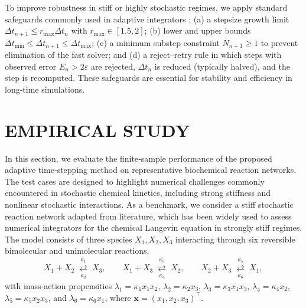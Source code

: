 \documentclass{article}
\begin{document}
To improve robustness in stiff or highly stochastic regimes, we apply standard
safeguards commonly used in adaptive integrators
\cite{ilie2015adaptive}:
(a) a stepsize growth limit
$\Delta t_{n+1}\le r_{\max}\Delta t_n$ with $r_{\max}\in[1.5,2]$;
(b) lower and upper bounds
$\Delta t_{\min}\le\Delta t_{n+1}\le\Delta t_{\max}$;
(c) a minimum substep constraint $N_{n+1}\ge1$ to prevent elimination of the
fast solver; and
(d) a reject--retry rule in which steps with observed error
$E_n>2\varepsilon$ are rejected, $\Delta t_n$ is reduced (typically halved), and
the step is recomputed.
These safeguards are essential for stability and efficiency in long‑time simulations.



\section{EMPIRICAL STUDY}
\label{sec:Empirical Study}


In this section, we evaluate the finite‑sample performance of the proposed adaptive time‑stepping method on representative biochemical reaction networks. The test cases are designed to highlight numerical challenges commonly encountered in stochastic chemical kinetics, including strong stiffness and nonlinear stochastic interactions. As a benchmark, we consider a stiff stochastic reaction network adapted from literature\cite{ilie2015adaptive}, which has been widely used to assess numerical integrators for the chemical Langevin equation in strongly stiff regimes.
The model consists of three species $X_1,X_2,X_3$ interacting through six reversible bimolecular and unimolecular reactions,
\[
\begin{aligned}
X_1+X_2 \;\overset{\kappa_1}{\underset{\kappa_2}{\rightleftarrows}}\; X_3,\qquad
X_1+X_3 \;\overset{\kappa_3}{\underset{\kappa_4}{\rightleftarrows}}\; X_2,\qquad
X_2+X_3 \;\overset{\kappa_5}{\underset{\kappa_6}{\rightleftarrows}}\; X_1,
\end{aligned}
\]
with mass-action propensities
$\lambda_1=\kappa_1 x_1x_2$, $\lambda_2=\kappa_2 x_3$,
$\lambda_3=\kappa_3 x_1x_3$, $\lambda_4=\kappa_4 x_2$,
$\lambda_5=\kappa_5 x_2x_3$, and $\lambda_6=\kappa_6 x_1$,
where $\pmb{x}=(x_1,x_2,x_3)^\top$.
\end{document}
